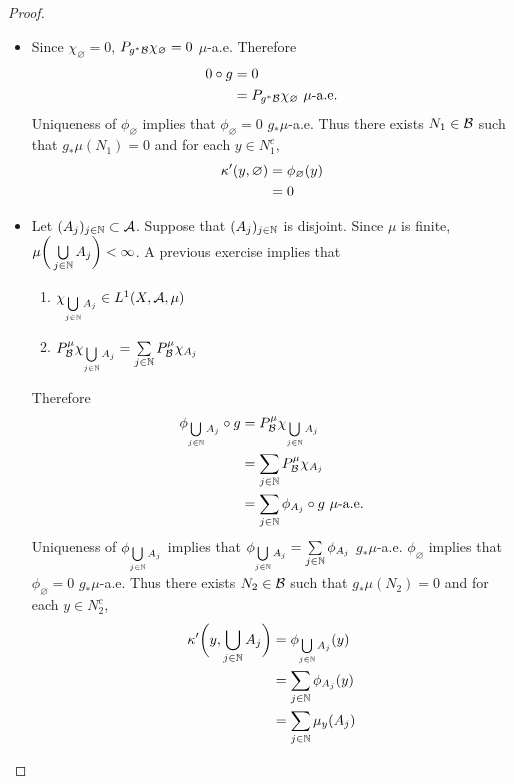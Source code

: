 \documentclass{book}
\begin{document}
	\begin{proof}\
		\begin{itemize}
			\item Since $\chi_{\varnothing} = 0$, $P_{g^*\mathcal{B}}\chi_{\varnothing} = 0$ $\mu$-a.e. Therefore
			\begin{align*}
				0 \circ g 
				& =  0 \\
				& = P_{g^*\mathcal{B}}\chi_{\varnothing} \text{ $\mu$-a.e.}
			\end{align*}
			Uniqueness of $\phi_{\varnothing}$ implies that $\phi_{\varnothing} = 0$ $g_*\mu$-a.e. Thus there exists $N_1 \in \mathcal{B}$ such that $g_*\mu(N_1) = 0$ and for each $y \in N_1^c$, 
			\begin{align*}
				\kappa'(y, \varnothing) 
				& = \phi_{\varnothing}(y) \\
				& = 0
			\end{align*}
			\item Let $(A_j)_{j \in \mathbb{N}} \subset \mathcal{A}$. Suppose that $(A_j)_{j \in \mathbb{N}}$ is disjoint. Since $\mu$ is finite, $\mu \bigg( \bigcup\limits_{j \in \mathbb{N}}A_j \bigg) < \infty$. A previous exercise implies that  
			\begin{enumerate}
				\item $\chi_{\bigcup\limits_{j \in \mathbb{N}} A_j} \in L^1(X, \mathcal{A}, \mu)$
				\item $P^{\mu}_{\mathcal{B}} \chi_{\bigcup\limits_{j \in \mathbb{N}} A_j} = \sum\limits_{j \in \mathbb{N}} P^{\mu}_{\mathcal{B}}\chi_{A_j}$
			\end{enumerate}
			Therefore
			\begin{align*}
				\phi_{\bigcup\limits_{j \in \mathbb{N}} A_j} \circ g
				& = P^{\mu}_{\mathcal{B}} \chi_{\bigcup\limits_{j \in \mathbb{N}} A_j} \\
				& = \sum\limits_{j \in \mathbb{N}} P^{\mu}_{\mathcal{B}}\chi_{A_j} \\
				& = \sum\limits_{j \in \mathbb{N}} \phi_{A_j} \circ g \text{ $\mu$-a.e.}
			\end{align*}
			Uniqueness of $\phi_{\bigcup\limits_{j \in \mathbb{N}} A_j}$ implies that $\phi_{\bigcup\limits_{j \in \mathbb{N}} A_j} = \sum\limits_{j \in \mathbb{N}} \phi_{A_j}$ $g_*\mu$-a.e. $\phi_{\varnothing}$ implies that $\phi_{\varnothing} = 0$ $g_*\mu$-a.e. Thus there exists $N_2 \in \mathcal{B}$ such that $g_*\mu(N_2) = 0$ and for each $y \in N_2^c$,
			\begin{align*}
				\kap' \bigg(y, \bigcup\limits_{j \in \N} A_j \bigg)
				& = \phi_{\bigcup\limits_{j \in \N} A_j}(y) \\
				& = \sum\limits_{j \in \N} \phi_{A_j}(y) \\
				& = \sum\limits_{j \in \N} \mu_y(A_j) \\

\end{align*}
\end{itemize}
\end{proof}
\end{document}
